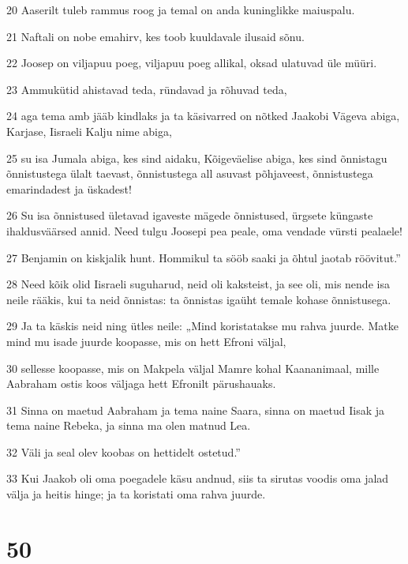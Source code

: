 \par 20 Aaserilt tuleb rammus roog ja temal on anda kuninglikke maiuspalu.
\par 21 Naftali on nobe emahirv, kes toob kuuldavale ilusaid sõnu.
\par 22 Joosep on viljapuu poeg, viljapuu poeg allikal, oksad ulatuvad üle müüri.
\par 23 Ammukütid ahistavad teda, ründavad ja rõhuvad teda,
\par 24 aga tema amb jääb kindlaks ja ta käsivarred on nõtked Jaakobi Vägeva abiga, Karjase, Iisraeli Kalju nime abiga,
\par 25 su isa Jumala abiga, kes sind aidaku, Kõigeväelise abiga, kes sind õnnistagu õnnistustega ülalt taevast, õnnistustega all asuvast põhjaveest, õnnistustega emarindadest ja üskadest!
\par 26 Su isa õnnistused ületavad igaveste mägede õnnistused, ürgsete küngaste ihaldusväärsed annid. Need tulgu Joosepi pea peale, oma vendade vürsti pealaele!
\par 27 Benjamin on kiskjalik hunt. Hommikul ta sööb saaki ja õhtul jaotab röövitut.”
\par 28 Need kõik olid Iisraeli suguharud, neid oli kaksteist, ja see oli, mis nende isa neile rääkis, kui ta neid õnnistas: ta õnnistas igaüht temale kohase õnnistusega.
\par 29 Ja ta käskis neid ning ütles neile: „Mind koristatakse mu rahva juurde. Matke mind mu isade juurde koopasse, mis on hett Efroni väljal,
\par 30 sellesse koopasse, mis on Makpela väljal Mamre kohal Kaananimaal, mille Aabraham ostis koos väljaga hett Efronilt pärushauaks.
\par 31 Sinna on maetud Aabraham ja tema naine Saara, sinna on maetud Iisak ja tema naine Rebeka, ja sinna ma olen matnud Lea.
\par 32 Väli ja seal olev koobas on hettidelt ostetud.”
\par 33 Kui Jaakob oli oma poegadele käsu andnud, siis ta sirutas voodis oma jalad välja ja heitis hinge; ja ta koristati oma rahva juurde.

\chapter{50}

